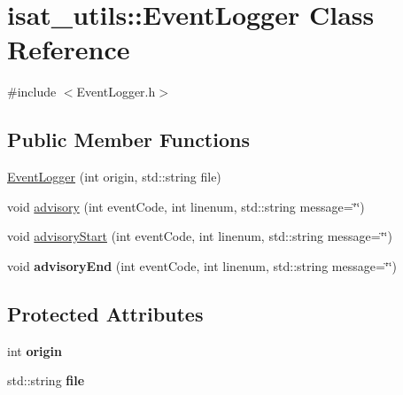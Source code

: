 \hypertarget{classisat__utils_1_1_event_logger}{}\section{isat\+\_\+utils\+:\+:Event\+Logger Class Reference}
\label{classisat__utils_1_1_event_logger}


{\ttfamily \#include $<$Event\+Logger.\+h$>$}

\subsection*{Public Member Functions}
\begin{DoxyCompactItemize}
\item 
\hyperlink{classisat__utils_1_1_event_logger_aa388db265b9d3ae2267bdb92a3a348fa}{Event\+Logger} (int origin, std\+::string file)
\item 
void \hyperlink{classisat__utils_1_1_event_logger_afa7b30b55dde728d55e5fb1cd865d768}{advisory} (int event\+Code, int linenum, std\+::string message=\char`\"{}\char`\"{})
\item 
void \hyperlink{classisat__utils_1_1_event_logger_abc20515e43ecdcdaa8cdcf85c1e0aa87}{advisory\+Start} (int event\+Code, int linenum, std\+::string message=\char`\"{}\char`\"{})
\item 
void {\bfseries advisory\+End} (int event\+Code, int linenum, std\+::string message=\char`\"{}\char`\"{})\hypertarget{classisat__utils_1_1_event_logger_a40144ea68f8f43f09dd3d9ed3079be44}{}\label{classisat__utils_1_1_event_logger_a40144ea68f8f43f09dd3d9ed3079be44}

\end{DoxyCompactItemize}
\subsection*{Protected Attributes}
\begin{DoxyCompactItemize}
\item 
int {\bfseries origin}\hypertarget{classisat__utils_1_1_event_logger_a8395abd5c58cfcc3272d277bbdb1d453}{}\label{classisat__utils_1_1_event_logger_a8395abd5c58cfcc3272d277bbdb1d453}

\item 
std\+::string {\bfseries file}\hypertarget{classisat__utils_1_1_event_logger_aa7129e5a84e978151f2432d7a43dcdb9}{}\label{classisat__utils_1_1_event_logger_aa7129e5a84e978151f2432d7a43dcdb9}

\end{DoxyCompactItemize}


